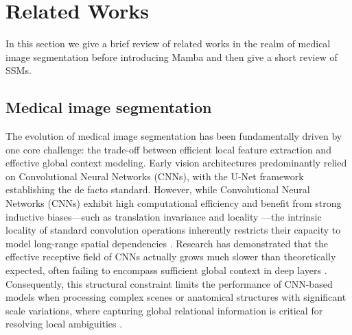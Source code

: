 \documentclass[10pt, a4paper, twocolumn]{article}
\begin{document}
\section{Related Works}

In this section we give a brief review of related works in the realm of medical image segmentation before introducing Mamba and then give a short review of SSMs.

\subsection{Medical image segmentation}

The evolution of medical image segmentation has been fundamentally driven by one core challenge: the trade-off between efficient local feature extraction and effective global context modeling. Early vision architectures predominantly relied on Convolutional Neural Networks (CNNs)\cite{ronneberger2015unet}, with the U-Net framework establishing the de facto standard. However, while Convolutional Neural Networks (CNNs) exhibit high computational efficiency and benefit from strong inductive biases—such as translation invariance and locality \cite{lecun2015deep, he2016resnet}—the intrinsic locality of standard convolution operations inherently restricts their capacity to model long-range spatial dependencies \cite{wang2018nonlocal}. Research has demonstrated that the effective receptive field of CNNs actually grows much slower than theoretically expected, often failing to encompass sufficient global context in deep layers \cite{luo2016erf}. Consequently, this structural constraint limits the performance of CNN-based models when processing complex scenes or anatomical structures with significant scale variations, where capturing global relational information is critical for resolving local ambiguities \cite{dosovitskiy2020vit, chen2021transunet}.
\end{document}

